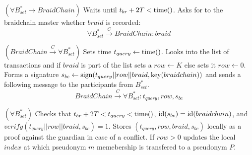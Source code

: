 \documentclass[12pt]{article}
\begin{document}
\begin{steps}
\item $(\forall B^*_{set} \to BraidChain)$ Waits until $t_{br} + 2T < {\rm time}()$. Asks for to the braidchain master whether $braid$ is recorded:
  \begin{equation}
    \forall B^*_{set} \overset{C}{\to} BraidChain: braid
  \end{equation}
  

\item $(BraidChain \overset{C}{\to} \forall B^*_{set})$ Sets time $t_{query} \leftarrow {\rm time}()$. Looks into the list of transactions and if $braid$ is part of the list sets a $row \leftarrow K$ else sets it $row \leftarrow 0$. Forms a signature $s_{bc} \leftarrow {\rm sign}(t_{query}||row||braid,{\rm key}(braidchain))$ and sends a following message to the participants from $B^*_{set}$.
  \begin{equation}
    BraidChain \overset{C}{\to} \forall B^*_{set}: t_{query}, row, s_{bc}
  \end{equation}
  
\item $(\forall B^*_{set})$ Checks that $t_{br} + 2T < t_{query} < {\rm time}()$, ${\rm id}(s_{bc}) = {\rm id}(braidchain)$, and \\ $verify(t_{query}||row||braid, s_{bc})=1$. Stores $(t_{query}, row, braid, s_{bc})$ locally as a proof against the guardian in case of a conflict. If $row>0$ updates the local $index$ at which pseudonym $m$ memebership is transfered to a pseudonym $P$.
  
\end{steps}
\end{document}
